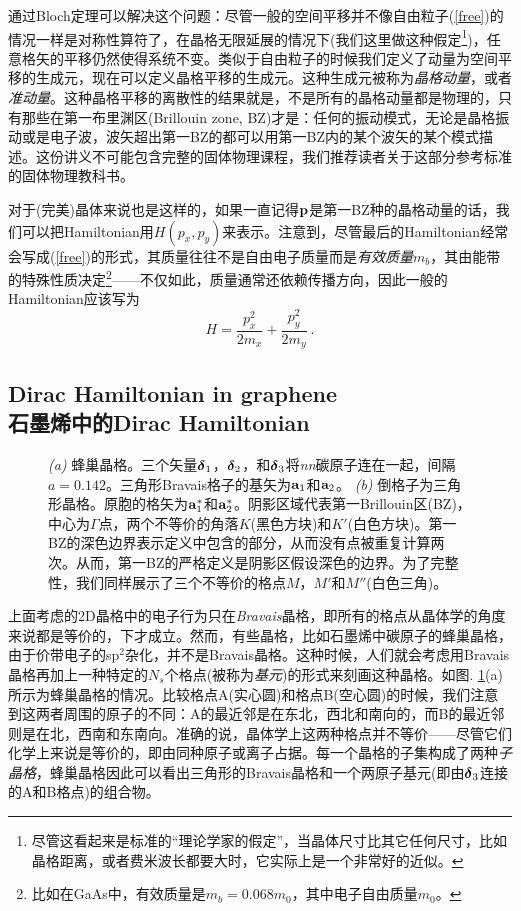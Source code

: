 \documentclass[10pt]{book}
\newcommand{\deltab}{\mbox{\boldmath $\delta $}}
\newcommand{\bp}{{\bf p}}
\newcommand{\ba}{{\bf a}}
\newcommand\itt{\it\color{blue}}
\begin{document}
通过Bloch定理可以解决这个问题：尽管一般的空间平移并不像自由粒子(\ref{free})的情况一样是对称性算符了，在晶格无限延展的情况下(我们这里做这种假定\footnote{尽管这看起来是标准的``理论学家的假定''，当晶体尺寸比其它任何尺寸，比如晶格距离，或者费米波长都要大时，它实际上是一个非常好的近似。})，任意格矢的平移仍然使得系统不变。类似于自由粒子的时候我们定义了动量为空间平移的生成元，现在可以定义晶格平移的生成元。这种生成元被称为{\itt 晶格动量}，或者{\itt 准动量}。这种晶格平移的离散性的结果就是，不是所有的晶格动量都是物理的，只有那些在第一布里渊区(Brillouin zone, BZ)才是：任何的振动模式，无论是晶格振动或是电子波，波矢超出第一BZ的都可以用第一BZ内的某个波矢的某个模式描述。这份讲义不可能包含完整的固体物理课程，我们推荐读者关于这部分参考标准的固体物理教科书\cite{AM,kittel}。

对于(完美)晶体来说也是这样的，如果一直记得$\bp$是第一BZ种的晶格动量的话，我们可以把Hamiltonian用$H(p_x,p_y)$来表示。注意到，尽管最后的Hamiltonian经常会写成(\ref{free})的形式，其质量往往不是自由电子质量而是{\itt 有效质量}$m_b$，其由能带的特殊性质决定\footnote{比如在GaAs中，有效质量是$m_b=0.068m_0$，其中电子自由质量$m_0$。}——不仅如此，质量通常还依赖传播方向，因此一般的Hamiltonian应该写为
\[H=\frac{p_x^2}{2m_x} + \frac{p_y^2}{2m_y}\ .\]


\subsection[石墨烯中的Dirac Hamiltonian]{Dirac Hamiltonian in graphene\\\bf 石墨烯中的Dirac Hamiltonian}

\begin{figure}
\begin{center}
\end{center}
\caption{ {\sl (a)} 蜂巢晶格。三个矢量$\deltab_1$，$\deltab_2$，和$\deltab_3$将{\itt nn}碳原子连在一起，间隔$a=0.142$。三角形Bravais格子的基矢为$\ba_1$和$\ba_2$。
{\sl (b)} 倒格子为三角形晶格。原胞的格矢为$\ba_1^*$和$\ba_2^*$。阴影区域代表第一Brillouin区(BZ)，中心为$\Gamma$点，两个不等价的角落$K$(黑色方块)和$K'$(白色方块)。第一BZ的深色边界表示定义中包含的部分，从而没有点被重复计算两次。从而，第一BZ的严格定义是阴影区假设深色的边界。为了完整性，我们同样展示了三个不等价的格点$M$，$M'$和$M''$(白色三角)。}
\label{fig07}
\end{figure}

上面考虑的2D晶格中的电子行为只在{\itt Bravais}晶格，即所有的格点从晶体学的角度来说都是等价的，下才成立。然而，有些晶格，比如石墨烯中碳原子的蜂巢晶格，由于价带电子的sp$^2$杂化，并不是Bravais晶格。这种时候，人们就会考虑用Bravais晶格再加上一种特定的$N_s$个格点(被称为{\itt 基元})的形式来刻画这种晶格。如图. \ref{fig07}(a)所示为蜂巢晶格的情况。比较格点A(实心圆)和格点B(空心圆)的时候，我们注意到这两者周围的原子的不同：A的最近邻是在东北，西北和南向的，而B的最近邻则是在北，西南和东南向。准确的说，晶体学上这两种格点并不等价——尽管它们化学上来说是等价的，即由同种原子或离子占据。每一个晶格的子集构成了两种{\itt 子晶格}，蜂巢晶格因此可以看出三角形的Bravais晶格和一个两原子基元(即由$\deltab_3$连接的A和B格点)的组合物。
\end{document}
